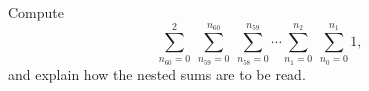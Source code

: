 Compute
\[\sum_{n_{60}=0}^{2}\ \sum_{n_{59}=0}^{n_{60}}\ \sum_{n_{58}=0}^{n_{59}}\cdots\sum_{n_{1}=0}^{n_{2}}\ \sum_{n_{0}=0}^{n_{1}}1,\]
and explain how the nested sums are to be read.
